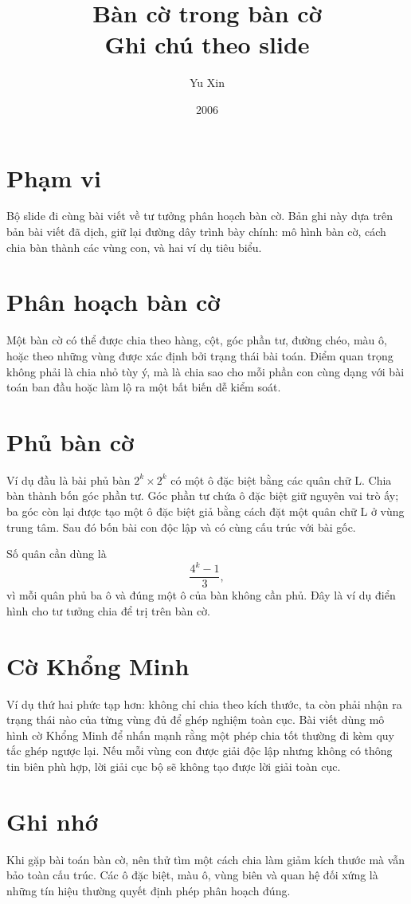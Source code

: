 \documentclass[11pt]{article}
\title{Bàn cờ trong bàn cờ\\{\large Ghi chú theo slide}}
\author{Yu Xin}
\date{2006}
\begin{document}
\maketitle


\section{Phạm vi}

Bộ slide đi cùng bài viết về tư tưởng phân hoạch bàn cờ. Bản ghi này dựa trên
bản bài viết đã dịch, giữ lại đường dây trình bày chính: mô hình bàn cờ, cách
chia bàn thành các vùng con, và hai ví dụ tiêu biểu.

\section{Phân hoạch bàn cờ}

Một bàn cờ có thể được chia theo hàng, cột, góc phần tư, đường chéo, màu ô,
hoặc theo những vùng được xác định bởi trạng thái bài toán. Điểm quan trọng
không phải là chia nhỏ tùy ý, mà là chia sao cho mỗi phần con cùng dạng với
bài toán ban đầu hoặc làm lộ ra một bất biến dễ kiểm soát.

\section{Phủ bàn cờ}

Ví dụ đầu là bài phủ bàn \(2^k\times 2^k\) có một ô đặc biệt bằng các quân
chữ L. Chia bàn thành bốn góc phần tư. Góc phần tư chứa ô đặc biệt giữ nguyên
vai trò ấy; ba góc còn lại được tạo một ô đặc biệt giả bằng cách đặt một quân
chữ L ở vùng trung tâm. Sau đó bốn bài con độc lập và có cùng cấu trúc với
bài gốc.

Số quân cần dùng là
\[
  \frac{4^k-1}{3},
\]
vì mỗi quân phủ ba ô và đúng một ô của bàn không cần phủ. Đây là ví dụ điển
hình cho tư tưởng chia để trị trên bàn cờ.

\section{Cờ Khổng Minh}

Ví dụ thứ hai phức tạp hơn: không chỉ chia theo kích thước, ta còn phải nhận
ra trạng thái nào của từng vùng đủ để ghép nghiệm toàn cục. Bài viết dùng mô
hình cờ Khổng Minh để nhấn mạnh rằng một phép chia tốt thường đi kèm quy tắc
ghép ngược lại. Nếu mỗi vùng con được giải độc lập nhưng không có thông tin
biên phù hợp, lời giải cục bộ sẽ không tạo được lời giải toàn cục.

\section{Ghi nhớ}

Khi gặp bài toán bàn cờ, nên thử tìm một cách chia làm giảm kích thước mà vẫn
bảo toàn cấu trúc. Các ô đặc biệt, màu ô, vùng biên và quan hệ đối xứng là
những tín hiệu thường quyết định phép phân hoạch đúng.
\end{document}

